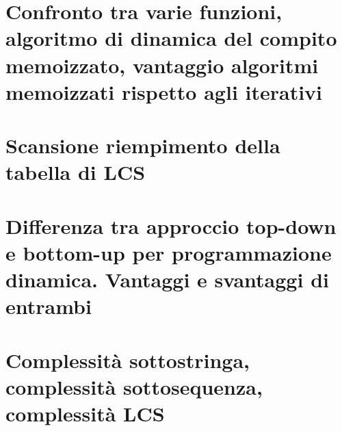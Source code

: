 \documentclass[12pt,oneside,a4paper]{article}
\begin{document}
\section{Confronto tra varie funzioni, algoritmo di dinamica del compito memoizzato, vantaggio algoritmi memoizzati rispetto agli iterativi}
\section{Scansione riempimento della tabella di LCS}
\section{Differenza tra approccio top-down e bottom-up per programmazione dinamica. Vantaggi e svantaggi di entrambi}
\section{Complessità sottostringa, complessità sottosequenza, complessità LCS}
\end{document}
